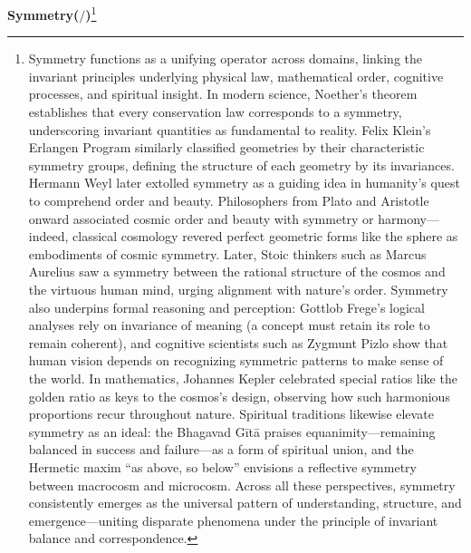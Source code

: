 \documentclass[11pt]{article}
\newcommand{\symtry}{\mathbin{/}}
\begin{document}
\newpage
\textbf{Symmetry(\( \symtry \))}\footnote{Symmetry functions as a unifying operator across domains, linking the invariant principles underlying physical law, mathematical order, cognitive processes, and spiritual insight. In modern science, Noether's theorem establishes that every conservation law corresponds to a symmetry, underscoring invariant quantities as fundamental to reality. Felix Klein's Erlangen Program similarly classified geometries by their characteristic symmetry groups, defining the structure of each geometry by its invariances. Hermann Weyl later extolled symmetry as a guiding idea in humanity's quest to comprehend order and beauty. Philosophers from Plato and Aristotle onward associated cosmic order and beauty with symmetry or harmony---indeed, classical cosmology revered perfect geometric forms like the sphere as embodiments of cosmic symmetry. Later, Stoic thinkers such as Marcus Aurelius saw a symmetry between the rational structure of the cosmos and the virtuous human mind, urging alignment with nature's order. Symmetry also underpins formal reasoning and perception: Gottlob Frege's logical analyses rely on invariance of meaning (a concept must retain its role to remain coherent), and cognitive scientists such as Zygmunt Pizlo show that human vision depends on recognizing symmetric patterns to make sense of the world. In mathematics, Johannes Kepler celebrated special ratios like the golden ratio as keys to the cosmos's design, observing how such harmonious proportions recur throughout nature. Spiritual traditions likewise elevate symmetry as an ideal: the Bhagavad Gītā praises equanimity---remaining balanced in success and failure---as a form of spiritual union, and the Hermetic maxim “as above, so below” envisions a reflective symmetry between macrocosm and microcosm. Across all these perspectives, symmetry consistently emerges as the universal pattern of understanding, structure, and emergence---uniting disparate phenomena under the principle of invariant balance and correspondence.}
\end{document}
